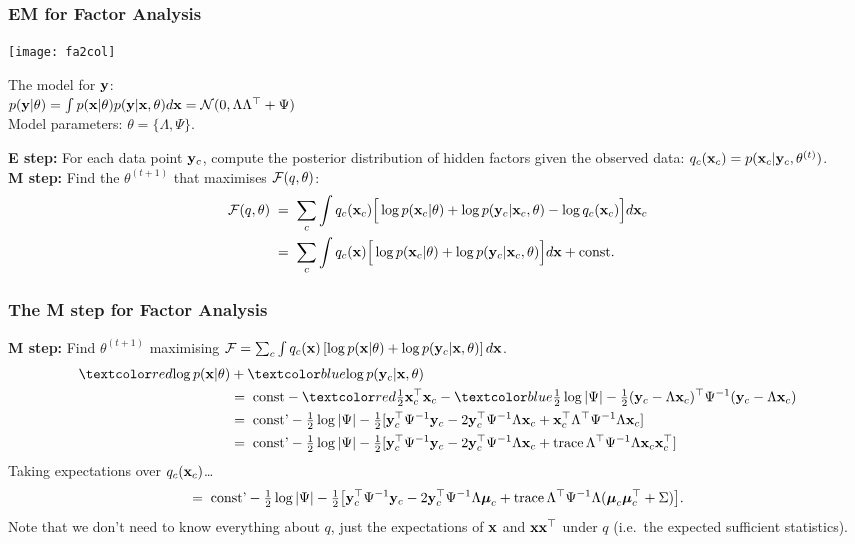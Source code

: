 \begin{frame}
\frametitle{EM for Factor Analysis}

\begin{minipage}{36mm}
\centerline{\texttt{[image: fa2col]}}
\end{minipage} \hspace{6mm}
\begin{minipage}{80mm}
The model for $\mathbf y$: \\
$ p(\mathbf y|\theta) = \int p(\mathbf x|\theta) p(\mathbf y|\mathbf x,\theta) d\mathbf x = {\cal
  N}(0,\Lambda \Lambda^\top + \Psi) $ \\
Model parameters: $\theta = \{ \Lambda, \Psi \}$.
\end{minipage}

\vspace{0.3in}

{\bf E step:} For each data point $\mathbf y_c$, compute the posterior
distribution of hidden factors given the observed data:
$q_c(\mathbf x_c)=p(\mathbf x_c|\mathbf y_c,\theta^{(t)})$. \\[1ex]

{\bf M step:} Find the $\theta^{(t+1)}$ that maximises ${\cal F}(q,\theta)$:
\[
\begin{split}
{\cal F}(q,\theta)\;&=\;\sum_c  \int q_c(\mathbf x_c)\Big[\log p(\mathbf x_c|\theta)+
\log p(\mathbf y_c|\mathbf x_c,\theta) - \log q_c(\mathbf x_c) \Big]  d\mathbf x_c \\
&=\;\sum_c \int q_c(\mathbf x) \Big[ \log p(\mathbf x_c|\theta) +
\log p(\mathbf y_c|\mathbf x_c,\theta) \Big] d\mathbf x + \text{const.}
\end{split}
\]
\end{frame}

\begin{frame}
\frametitle{The M step for Factor Analysis}

{\bf M step:} Find $\theta^{(t+1)}$ maximising ${\cal F} = \sum_c \int
q_c(\mathbf x)\left[\log p(\mathbf x|\theta)+\log p(\mathbf y_c|\mathbf x,\theta) \right] d\mathbf x$.
%
\[
\begin{split}
\Red{\log p(\bfx|\theta)}&+\Blue{\log p(\bfy_c|\bfx,\theta)}\\
&=\;\mbox{const}-\Red{\tfrac{1}{2}\bfx_c^\top\bfx_c}-\Blue{\tfrac{1}{2}\log|\Psi|
-\tfrac{1}{2}(\bfy_c-\Lambda\bfx_c)^\top\Psi^{-1}(\bfy_c-\Lambda \bfx_c)} \\
&=\;\mbox{const'}-\tfrac{1}{2}\log|\Psi|-\tfrac{1}{2}
[\bfy_c^\top\Psi^{-1}\bfy_c-2\bfy_c^\top\Psi^{-1}\Lambda\bfx_c+
\bfx_c^\top\Lambda^\top\Psi^{-1}\Lambda\bfx_c] \\
&=\;\mbox{const'}-\tfrac{1}{2}\log|\Psi|-\tfrac{1}{2}[\bfy_c^\top\Psi^{-1}
\bfy_c-2\bfy_c^\top\Psi^{-1}\Lambda\bfx_c+
\trace{\Lambda^\top\Psi^{-1}\Lambda \bfx_c\bfx_c^\top}]
\end{split}
\]
%
Taking expectations over $q_c(\mathbf x_c)$\ldots
%
\[
=\;\mbox{const'}-\tfrac{1}{2}\log|\Psi|-\tfrac{1}{2}\big[\mathbf y_c^\top\Psi^{-1}
\mathbf y_c-2\mathbf y_c^\top\Psi^{-1}\Lambda{\boldsymbol{\mu}}_c+\operatorname{trace}{\Lambda^\top
\Psi^{-1} \Lambda ({\boldsymbol{\mu}}_c {\boldsymbol{\mu}}_c^\top + \Sigma)}\big].
\]
%
Note that we don't need to know everything about $q$, just the
expectations of $\mathbf x$ and $\mathbf x\mathbf x^\top$ under $q$ (i.e.\ the expected
sufficient statistics).

\end{frame}

